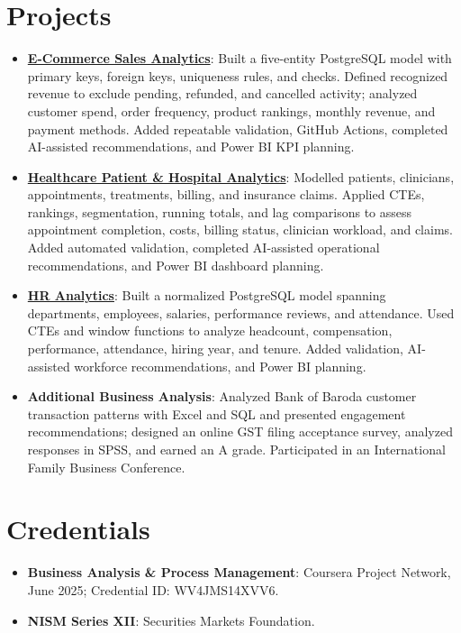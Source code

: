 \documentclass[letterpaper,11pt]{article}
\newcommand{\resumeProject}[2]{
  \item\small{\textbf{#1}: #2\vspace{-2pt}}
}
\newcommand{\resumeSubHeadingListStart}{\begin{itemize}[leftmargin=*,topsep=1pt,itemsep=2pt,parsep=0pt,partopsep=0pt]}
\newcommand{\resumeSubHeadingListEnd}{\end{itemize}\vspace{-2pt}}
\begin{document}
\section{Projects}
\resumeSubHeadingListStart
  \resumeProject{\href{https://github.com/jainalimehta/Ecommerce-Sales-Analytics}{E-Commerce Sales Analytics}}{Built a five-entity PostgreSQL model with primary keys, foreign keys, uniqueness rules, and checks. Defined recognized revenue to exclude pending, refunded, and cancelled activity; analyzed customer spend, order frequency, product rankings, monthly revenue, and payment methods. Added repeatable validation, GitHub Actions, completed AI-assisted recommendations, and Power BI KPI planning.}
  \resumeProject{\href{https://github.com/jainalimehta/Healthcare-Analytics}{Healthcare Patient \& Hospital Analytics}}{Modelled patients, clinicians, appointments, treatments, billing, and insurance claims. Applied CTEs, rankings, segmentation, running totals, and lag comparisons to assess appointment completion, costs, billing status, clinician workload, and claims. Added automated validation, completed AI-assisted operational recommendations, and Power BI dashboard planning.}
  \resumeProject{\href{https://github.com/jainalimehta/HR-Analytics}{HR Analytics}}{Built a normalized PostgreSQL model spanning departments, employees, salaries, performance reviews, and attendance. Used CTEs and window functions to analyze headcount, compensation, performance, attendance, hiring year, and tenure. Added validation, AI-assisted workforce recommendations, and Power BI planning.}
  \resumeProject{Additional Business Analysis}{Analyzed Bank of Baroda customer transaction patterns with Excel and SQL and presented engagement recommendations; designed an online GST filing acceptance survey, analyzed responses in SPSS, and earned an A grade. Participated in an International Family Business Conference.}
\resumeSubHeadingListEnd

\section{Credentials}
\resumeSubHeadingListStart
  \resumeProject{Business Analysis \& Process Management}{Coursera Project Network, June 2025; Credential ID: WV4JMS14XVV6.}
  \resumeProject{NISM Series XII}{Securities Markets Foundation.}
\resumeSubHeadingListEnd
\end{document}
